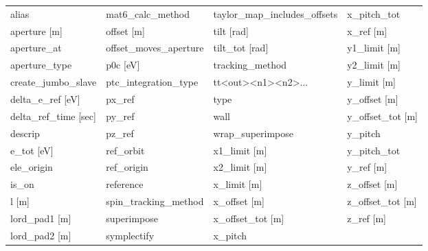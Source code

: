  \begin{tabular}{llll} \toprule
alias                            & mat6_calc_method                 & taylor_map_includes_offsets      & x_pitch_tot                      \\
aperture [m]                     & offset [m]                       & tilt [rad]                       & x_ref [m]                        \\
aperture_at                      & offset_moves_aperture            & tilt_tot [rad]                   & y1_limit [m]                     \\
aperture_type                    & p0c [eV]                         & tracking_method                  & y2_limit [m]                     \\
create_jumbo_slave               & ptc_integration_type             & tt<out><n1><n2>...               & y_limit [m]                      \\
delta_e_ref [eV]                 & px_ref                           & type                             & y_offset [m]                     \\
delta_ref_time [sec]             & py_ref                           & wall                             & y_offset_tot [m]                 \\
descrip                          & pz_ref                           & wrap_superimpose                 & y_pitch                          \\
e_tot [eV]                       & ref_orbit                        & x1_limit [m]                     & y_pitch_tot                      \\
ele_origin                       & ref_origin                       & x2_limit [m]                     & y_ref [m]                        \\
is_on                            & reference                        & x_limit [m]                      & z_offset [m]                     \\
l [m]                            & spin_tracking_method             & x_offset [m]                     & z_offset_tot [m]                 \\
lord_pad1 [m]                    & superimpose                      & x_offset_tot [m]                 & z_ref [m]                        \\
lord_pad2 [m]                    & symplectify                      & x_pitch                          &                                  \\
 \bottomrule
 \end{tabular}
 \vfill
 

